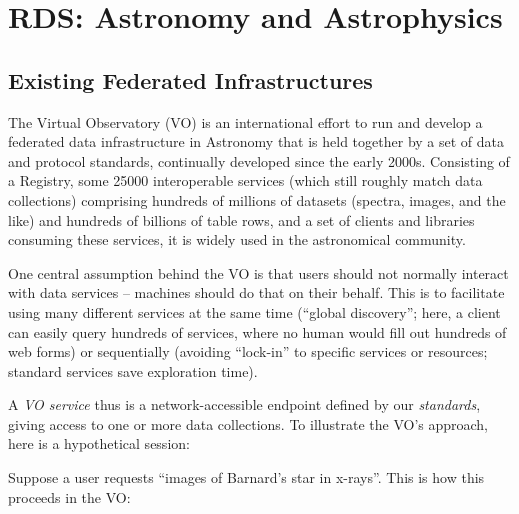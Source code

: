 \section{RDS: Astronomy and Astrophysics}
\label{sect:rds}


\subsection{Existing Federated Infrastructures}

The Virtual Observatory (VO) is an international effort to run and
develop a federated data infrastructure in Astronomy that is held
together by a set of data and protocol standards, continually developed
since the early 2000s.  Consisting of a Registry, some 25000
interoperable services (which still roughly match data collections)
comprising hundreds of millions of datasets (spectra, images, and the
like) and hundreds of billions of table rows, and a set of clients and
libraries consuming these services, it is widely used in the
astronomical community.

One central assumption behind the VO is that users should not normally
interact with data services -- machines should do that on their behalf.
This is to facilitate using many different services at the same time
(``global discovery''; here, a client can easily query hundreds of
services, where no human would fill out hundreds of web forms) or
sequentially (avoiding ``lock-in'' to specific services or resources;
standard services save exploration time).

A \emph{VO service} thus is a network-accessible endpoint defined by 
our \emph{standards}, giving access to one or more data collections.  
To illustrate the VO's approach, here is a hypothetical session:

Suppose a user requests ``images of Barnard's
star in x-rays''.  This is how this proceeds in the VO:

